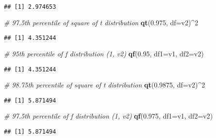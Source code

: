 \documentclass[
]{article}
\newenvironment{Shaded}{\begin{snugshade}}{\end{snugshade}}
\newcommand{\AttributeTok}[1]{\textcolor[rgb]{0.13,0.29,0.53}{#1}}
\newcommand{\CommentTok}[1]{\textcolor[rgb]{0.56,0.35,0.01}{\textit{#1}}}
\newcommand{\DecValTok}[1]{\textcolor[rgb]{0.00,0.00,0.81}{#1}}
\newcommand{\FloatTok}[1]{\textcolor[rgb]{0.00,0.00,0.81}{#1}}
\newcommand{\FunctionTok}[1]{\textcolor[rgb]{0.13,0.29,0.53}{\textbf{#1}}}
\newcommand{\NormalTok}[1]{#1}
\newcommand{\SpecialCharTok}[1]{\textcolor[rgb]{0.81,0.36,0.00}{\textbf{#1}}}
\begin{document}
\begin{verbatim}
## [1] 2.974653
\end{verbatim}

\begin{Shaded}
\begin{Highlighting}[]
\CommentTok{\# 97.5th percentile of square of t distribution}
\FunctionTok{qt}\NormalTok{(}\FloatTok{0.975}\NormalTok{, }\AttributeTok{df=}\NormalTok{v2)}\SpecialCharTok{\^{}}\DecValTok{2}
\end{Highlighting}
\end{Shaded}

\begin{verbatim}
## [1] 4.351244
\end{verbatim}

\begin{Shaded}
\begin{Highlighting}[]
\CommentTok{\# 95th percentile of f distribution (1, v2)}
\FunctionTok{qf}\NormalTok{(}\FloatTok{0.95}\NormalTok{, }\AttributeTok{df1=}\NormalTok{v1, }\AttributeTok{df2=}\NormalTok{v2)}
\end{Highlighting}
\end{Shaded}

\begin{verbatim}
## [1] 4.351244
\end{verbatim}

\begin{Shaded}
\begin{Highlighting}[]
\CommentTok{\# 98.75th percentile of square of t distribution}
\FunctionTok{qt}\NormalTok{(}\FloatTok{0.9875}\NormalTok{, }\AttributeTok{df=}\NormalTok{v2)}\SpecialCharTok{\^{}}\DecValTok{2}
\end{Highlighting}
\end{Shaded}

\begin{verbatim}
## [1] 5.871494
\end{verbatim}

\begin{Shaded}
\begin{Highlighting}[]
\CommentTok{\# 97.5th percentile of f distribution (1, v2)}
\FunctionTok{qf}\NormalTok{(}\FloatTok{0.975}\NormalTok{, }\AttributeTok{df1=}\NormalTok{v1, }\AttributeTok{df2=}\NormalTok{v2)}
\end{Highlighting}
\end{Shaded}

\begin{verbatim}
## [1] 5.871494
\end{verbatim}
\end{document}
